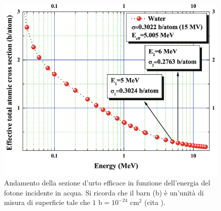 \documentclass[12pt,a4paper,twoside]{report}
\begin{document}
	\begin{figure}[H]
		\centering
		\includegraphics[width=0.9\linewidth]{attenuation_water.png}
		\caption{Andamento della sezione d'urto efficace in funzione dell'energia del fotone incidente in acqua. Si ricorda che il barn (b) è un'unità di misura di superficie tale che $1\mbox{ b}=10^{-24}\mbox{ cm}^{2}$ (cita
			).}
		\label{fig:attenuation_water}
	\end{figure}
	
\end{document}
